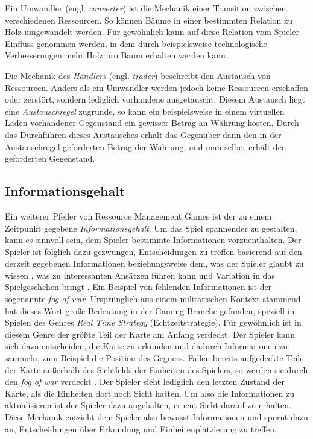 Ein Umwandler (engl. \textit{converter}) ist die Mechanik einer Transition zwischen verschiedenen Ressourcen. So können Bäume in einer bestimmten Relation zu Holz umgewandelt werden. Für gewöhnlich kann auf diese Relation vom Spieler Einfluss genommen werden, in dem durch beispielsweise technologische Verbesserungen mehr Holz pro Baum erhalten werden kann.

Die Mechanik des \textit{Händlers} (engl. \textit{trader}) beschreibt den Austausch von Ressourcen. Anders als ein Umwandler werden jedoch keine Ressourcen erschaffen oder zerstört, sondern lediglich vorhandene ausgetauscht. Diesem Austausch liegt eine \textit{Austauschregel} zugrunde, so kann ein beispielsweise in einem virtuellen Laden vorhandener Gegenstand ein gewisser Betrag an Währung kosten. Durch das Durchführen dieses Austausches erhält das Gegenüber dann den in der Austauschregel geforderten Betrag der Währung, und man selber erhält den geforderten Gegenstand.

\subsection{Informationsgehalt}
Ein weiterer Pfeiler von Ressource Management Games ist der zu einem Zeitpunkt gegebene \textit{Informationsgehalt}. Um das Spiel spannender zu gestalten, kann es sinnvoll sein, dem Spieler bestimmte Informationen vorzuenthalten. Der Spieler ist folglich dazu gezwungen, Entscheidungen zu treffen basierend auf den derzeit gegebenen Informationen beziehungsweise dem, was der Spieler glaubt zu wissen \cite*[]{paper:information}, was zu interessanten Ansätzen führen kann und Variation in das Spielgeschehen bringt \cite*[]{definition:ressourcemanagementfandom}. Ein Beispiel von fehlenden Informationen ist der sogenannte \textit{fog of war}. Ursprünglich aus einem militärischen Kontext stammend hat dieses Wort große Bedeutung in der Gaming Branche gefunden, speziell in Spielen des Genres \textit{Real Time Strategy} (Echtzeitstrategie). Für gewöhnlich ist in diesem Genre der größte Teil der Karte am Anfang verdeckt. Der Spieler kann sich dazu entscheiden, die Karte zu erkunden und dadurch Informationen zu sammeln, zum Beispiel die Position des Gegners. Fallen bereits aufgedeckte Teile der Karte außerhalb des Sichtfelds der Einheiten des Spielers, so werden sie durch den \textit{fog of war} verdeckt \cite*[]{article:fogofwar}. Der Spieler sieht lediglich den letzten Zustand der Karte, als die Einheiten dort noch Sicht hatten. Um also die Informationen zu aktualisieren ist der Spieler dazu angehalten, erneut Sicht darauf zu erhalten. Diese Mechanik entzieht dem Spieler also bewusst Informationen und spornt dazu an, Entscheidungen über Erkundung und Einheitenplatzierung zu treffen. 

